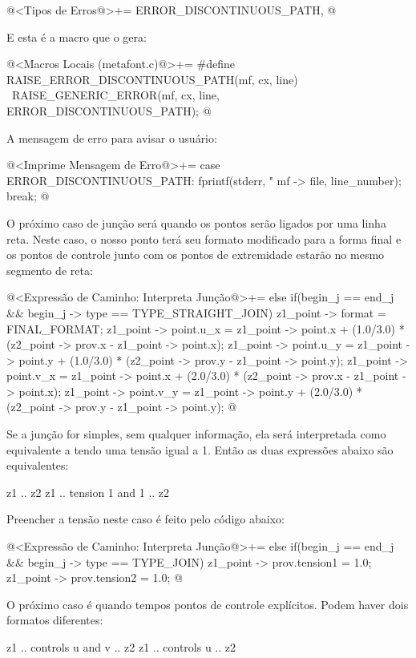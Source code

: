 {{{{{{\iniciocodigo
@<Tipos de Erros@>+=
ERROR_DISCONTINUOUS_PATH,
@
\fimcodigo

E esta é a macro que o gera:

\iniciocodigo
@<Macros Locais (metafont.c)@>+=
#define RAISE_ERROR_DISCONTINUOUS_PATH(mf, cx, line) {\
  RAISE_GENERIC_ERROR(mf, cx, line, ERROR_DISCONTINUOUS_PATH);}
@
\fimcodigo

A mensagem de erro para avisar o usuário:

\iniciocodigo
@<Imprime Mensagem de Erro@>+=
case ERROR_DISCONTINUOUS_PATH:
  fprintf(stderr,
          "%
          mf -> file, line_number);
  break;
@
\fimcodigo

O próximo caso de junção será quando os pontos serão ligados por uma
linha reta. Neste caso, o nosso ponto terá seu formato modificado para
a forma final e os pontos de controle junto com os pontos de
extremidade estarão no mesmo segmento de reta:

\iniciocodigo
@<Expressão de Caminho: Interpreta Junção@>+=
else if(begin_j == end_j && begin_j -> type == TYPE_STRAIGHT_JOIN){
  z1_point -> format = FINAL_FORMAT;
  z1_point -> point.u_x = z1_point -> point.x + (1.0/3.0) *
                         (z2_point -> prov.x - z1_point -> point.x);
  z1_point -> point.u_y = z1_point -> point.y + (1.0/3.0) *
                         (z2_point -> prov.y - z1_point -> point.y);
  z1_point -> point.v_x = z1_point -> point.x + (2.0/3.0) *
                         (z2_point -> prov.x - z1_point -> point.x);
  z1_point -> point.v_y = z1_point -> point.y + (2.0/3.0) *
                         (z2_point -> prov.y - z1_point -> point.y);
}
@
\fimcodigo

Se a junção for simples, sem qualquer informação, ela será
interpretada como equivalente a tendo uma tensão igual a 1. Então as
duas expressões abaixo são equivalentes:

\alinhaverbatim
z1 .. z2
z1 .. tension 1 and 1 .. z2
\alinhanormal

Preencher a tensão neste caso é feito pelo código abaixo:

\iniciocodigo
@<Expressão de Caminho: Interpreta Junção@>+=
else if(begin_j == end_j && begin_j -> type == TYPE_JOIN){
  z1_point -> prov.tension1 = 1.0;
  z1_point -> prov.tension2 = 1.0;
}
@
\fimcodigo

O próximo caso é quando tempos pontos de controle explícitos. Podem
haver dois formatos diferentes:

\alinhaverbatim
z1 .. controls u and v .. z2
z1 .. controls u .. z2
\alinhanormal

}}}}}}
